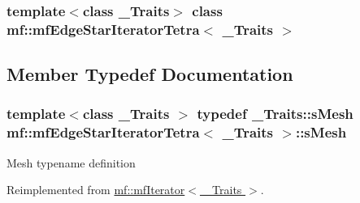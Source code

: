 \subsubsection*{template$<$class \_\-Traits$>$ class mf::mfEdgeStarIteratorTetra$<$ \_\-Traits $>$}



\subsection{Member Typedef Documentation}
\hypertarget{classmf_1_1mfEdgeStarIteratorTetra_abbb7ca848037b976d69368943567397b}{
\subsubsection[{sMesh}]{\setlength{\rightskip}{0pt plus 5cm}template$<$class \_\-Traits $>$ typedef \_\-Traits::sMesh {\bf mf::mfEdgeStarIteratorTetra}$<$ \_\-Traits $>$::{\bf sMesh}}}
\label{classmf_1_1mfEdgeStarIteratorTetra_abbb7ca848037b976d69368943567397b}
Mesh typename definition 

Reimplemented from \hyperlink{classmf_1_1mfIterator_aca31e4d7e7eca4e3b100530d8725064b}{mf::mfIterator$<$ \_\-Traits $>$}.



